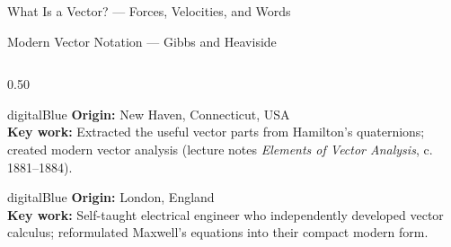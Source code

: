 \begin{frame}[shrink=23]{What Is a Vector? --- Forces, Velocities, and Words}
\end{frame}

\begin{frame}[shrink=1]{Modern Vector Notation --- Gibbs and Heaviside}

  \begin{columns}[T]
    \begin{column}{0.50\textwidth}
      \begin{personbox}{digitalBlue}
        \small
        \textbf{Origin:} New Haven, Connecticut, USA\\
        \textbf{Key work:} Extracted the useful vector parts from Hamilton's
        quaternions; created modern vector analysis
        (lecture notes \emph{Elements of Vector Analysis}, c.\,1881--1884).
      \end{personbox}

      \vspace{0.3em}
      \begin{personbox}{digitalBlue}
        \small
        \textbf{Origin:} London, England\\
        \textbf{Key work:} Self-taught electrical engineer who independently developed
        vector calculus; reformulated Maxwell's equations into their compact modern form.
      \end{personbox}
    \end{column}


\end{columns}
\end{frame}
